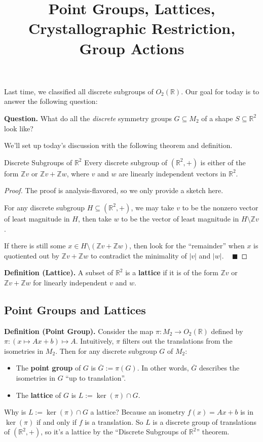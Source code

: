 \title{Point Groups, Lattices, Crystallographic Restriction, Group Actions}



Last time, we classified all discrete subgroups of $O_2(\mathbb{R})$.  Our goal for today is to answer the following question:

\begin{boxed-text}[42em]
\textbf{Question.} What do all the \emph{discrete} symmetry groups $G \subseteq M_2$ of a shape $S \subseteq \mathbb{R}^2$ look like?
\end{boxed-text}

We'll set up today's discussion with the following theorem and definition.

\begin{theorem}{Discrete Subgroups of $\mathbb{R}^2$}
    Every discrete subgroup of $(\mathbb{R}^2, +)$ is either of the form $\mathbb{Z}v$ or $\mathbb{Z}v + \mathbb{Z}w$, where $v$ and $w$ are linearly independent vectors in $\mathbb{R}^2$.
\end{theorem}

\begin{proof}
    The proof is analysis-flavored, so we only provide a sketch here.
    
    For any discrete subgroup $H \subseteq (\mathbb{R}^2, +)$, we may take $v$ to be the nonzero vector of least magnitude in $H$, then take $w$ to be the vector of least magnitude in $H \setminus \mathbb{Z}v$.
    
    If there is still some $x \in H \setminus (\mathbb{Z}v + \mathbb{Z}w)$, then look for the ``remainder'' when $x$ is quotiented out by $\mathbb{Z}v + \mathbb{Z}w$ to contradict the minimality of $|v|$ and $|w|$. ~ $\blacksquare$
\end{proof}

\textbf{Definition (Lattice).} A subset of $\mathbb{R}^2$ is a \textbf{lattice} if it is of the form $\mathbb{Z}v$ or $\mathbb{Z}v + \mathbb{Z}w$ for linearly independent $v$ and $w$.

\subsection{Point Groups and Lattices}

\textbf{Definition (Point Group).} Consider the map $\pi: M_2 \to O_2(\mathbb{R})$ defined by $\pi: (x \mapsto Ax + b) \mapsto A$.  Intuitively, $\pi$ filters out the translations from the isometries in $M_2$. Then for any discrete subgroup $G$ of $M_2$:
\begin{itemize}
    \item The \textbf{point group} of $G$ is $\overline{G} := \pi(G)$.  In other words, $\overline{G}$ describes the isometries in $G$ ``up to translation''.
    \item The \textbf{lattice} of $G$ is $L := \ker(\pi) \cap G$.
\end{itemize}
Why is $L := \ker(\pi) \cap G$ a lattice?  Because an isometry $f(x) = Ax + b$ is in $\ker(\pi)$ if and only if $f$ is a translation.  So $L$ is a discrete group of translations of $(\mathbb{R}^2, +)$, so it's a lattice by the ``Discrete Subgroups of $\mathbb{R}^2$'' theorem.

